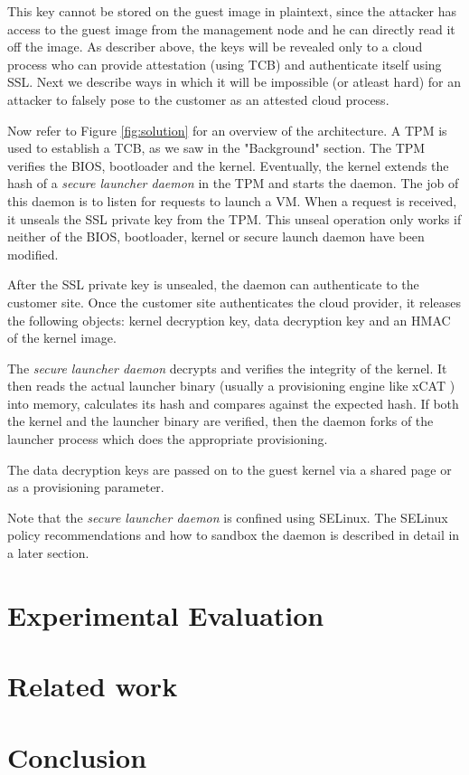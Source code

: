 \documentclass[10pt,twocolumn,pdftex]{article}
\begin{document}
This key cannot be stored on the guest image in plaintext, since the attacker has access to the guest image from the management node and he can directly read it off the image. As describer above, the keys will be revealed only to a cloud process who can provide attestation (using TCB) and authenticate itself using SSL. Next we describe ways in which it will be impossible (or atleast hard) for an attacker to falsely pose to the customer as an attested cloud process.

Now refer to Figure \ref{fig:solution} for an overview of the architecture.
A TPM is used to establish a TCB, as we saw in the "Background" section. The TPM verifies the BIOS, bootloader and the kernel. Eventually, the kernel extends the hash of a \emph{secure launcher daemon} in the TPM and starts the daemon. The job of this daemon is to listen for requests to launch a VM. When a request is received, it unseals the SSL private key from the TPM. This unseal operation only works if neither of the BIOS, bootloader, kernel or secure launch daemon have been modified.

After the SSL private key is unsealed, the daemon can authenticate to the customer site. Once the customer site authenticates the cloud provider, it releases the following objects: kernel decryption key, data decryption key and an HMAC of the kernel image.

The \emph{secure launcher daemon} decrypts and verifies the integrity of the kernel. It then reads the actual launcher binary (usually a provisioning engine like xCAT \cite{xCAT}) into memory, calculates its hash and compares against the expected hash. If both the kernel and the launcher binary are verified, then the daemon forks of the launcher process which does the appropriate provisioning.

The data decryption keys are passed on to the guest kernel via a shared page or as a provisioning parameter.

Note that the \emph{secure launcher daemon} is confined using SELinux. The SELinux policy recommendations and how to sandbox the daemon is described in detail in a later section.

\section{Experimental Evaluation}
\label{sec:evaluation}


\section{Related work}
\label{sec:related}

\section{Conclusion}
\label{sec:conclusion}

{}

\end{document}
